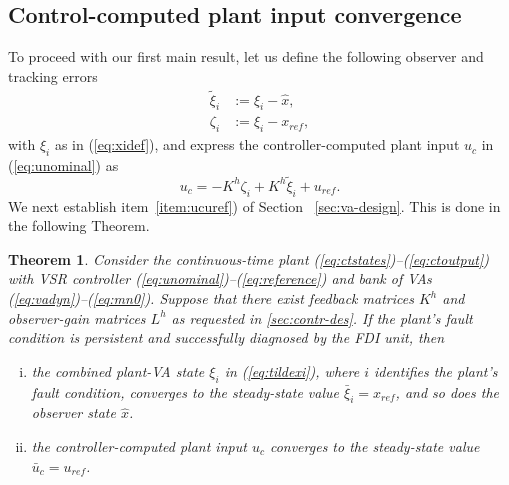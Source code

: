 \documentclass[letterpaper, 10 pt, conference]{ieeeconf}
\newcommand{\dfn}{:=}
\newtheorem{thm}{Theorem}
\begin{document}
\subsection{Control-computed plant input convergence}
\label{sec:convergence}
To proceed with our first main result, let us define the following
observer and tracking errors
\begin{align}
  \label{eq:tildexi}
    \tilde{\xi}_i &\dfn \xi_i - \hat{x}, \\
  \label{eq:zeta}
    \zeta_i &\dfn \xi_i-x_{ref},
\end{align}
with $\xi_i$ as in (\ref{eq:xidef}), and express the
controller-computed plant input $u_c$ in (\ref{eq:unominal}) as
\begin{equation}
 \label{eq:ucthetazeta}
  u_c = -K^h \zeta _i +K^h\tilde{\xi}_i+u_{ref}.
\end{equation}
We next establish item~\ref{item:ucuref}) of
Section ~\ref{sec:va-design}. This is done in the following Theorem.
\begin{thm}
  \label{thm:ucbar}
  Consider the continuous-time plant
  (\ref{eq:ctstates})--(\ref{eq:ctoutput}) with VSR controller
  (\ref{eq:unominal})--(\ref{eq:reference}) and bank of VAs
  (\ref{eq:vadyn})--(\ref{eq:mn0}). Suppose that there exist feedback
  matrices $K^h$ and observer-gain matrices $L^h$ as requested in
  \ref{sec:contr-des}. If the plant's fault
  condition is persistent and successfully diagnosed by the FDI unit, then
  \begin{enumerate}[i)]
  \item the combined plant-VA state $\xi_i$ in (\ref{eq:tildexi}),
    where $i$ identifies the plant's fault condition, converges to the
    steady-state value $\bar\xi_i = x_{ref}$, and so does the observer
    state $\hat x$.\label{item:xitzetaconv}
  \item the controller-computed plant input $u_c$ converges to the
    steady-state value $\bar u_c = u_{ref}$.\label{item:ucconv}
  \end{enumerate}
\end{thm}
\end{document}
